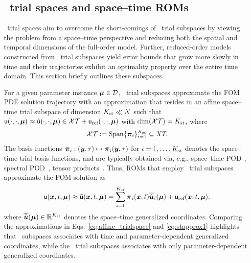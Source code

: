 \documentclass[3p,computermodern,10pt]{elsarticle}
\begin{document}
\subsection{\spaceTimeAcronym\ trial spaces and space--time ROMs}
\spaceTimeAcronym\ trial
spaces aim to overcome the short-comings of \spatialAcronym\ trial subspaces by viewing the problem from a space--time perspective and reducing both the spatial and temporal dimensions of the full-order
model. Further, reduced-order models constructed from \spaceTimeAcronym\ trial subspaces yield error bounds that grow more slowly in time and
their trajectories exhibit an optimality property over the entire time domain. This section briefly outlines these subspaces.

For a given parameter instance $\boldsymbol \mu \in \mathcal{D}$, \spaceTimeAcronym\ trial subspaces approximate the FOM PDE solution
trajectory with an approximation that resides in an
	affine space--time trial subspace of dimension $K_{\text{st}}\ll N$ such that $\mathsf{u}(\cdot,\cdot,\boldsymbol \mu) \approx 
	\tilde{\mathsf{u}}(\cdot,\cdot,\boldsymbol \mu) \in \mathcal{XT} + \mathsf{u}_{\text{ref}}(\cdot,\cdot,\boldsymbol \mu)$ with $\dim(\mathcal{XT}) =K_{\text{st}} $, where
\begin{equation}\label{eq:sttrialspace_def}
 \mathcal{XT} \vcentcolon= 
	\text{Span}\{\boldsymbol \pi_i\}_{i=1}^{K_{\text{st}}} 
	\subseteq \textit{XT}.
\end{equation}
The basis functions $\boldsymbol \pi_i: (\boldsymbol y,\tau) \mapsto \boldsymbol \pi_i(\boldsymbol y,\tau)$ for $i=1,\ldots,K_{\text{st}}$ denotes the space--time trial basis functions, and are typically obtained via, e.g., space--time POD~\cite{}, spectral POD~\cite{}, tensor products~\cite{choi_stlspg}. Thus, ROMs that employ
\spaceTimeAcronym\ trial subspaces approximate the FOM solution as
\begin{equation}\label{eq:stapprox1}
 \mathsf{u}(\boldsymbol x, t,\boldsymbol \mu) \approx \tilde{\mathsf{u}}(\boldsymbol x, t,\boldsymbol \mu) = \sum_{i=1}^{K_{\text{st}}} \boldsymbol \pi_i(\boldsymbol x,t) \overline{\hat{\boldsymbol u}}_i(\boldsymbol \mu) + \mathsf{u}_{\text{ref}}(\boldsymbol x, t,\boldsymbol \mu),
\end{equation}
where $ \overline{\hat{\boldsymbol u}}(\boldsymbol \mu) \in \mathbb{R}^{K_{\text{st}}}$ denotes the space--time generalized coordinates. Comparing the approximations in Eqs.~\eqref{eq:affine_trialspace} and \eqref{eq:stapprox1} 
highlights that \spatialAcronym\ subspaces associates with time and parameter-dependent
generalized coordinates, while the \spaceTimeAcronym\ trial subspaces associates with only parameter-dependent generalized coordinates. 
\end{document}
